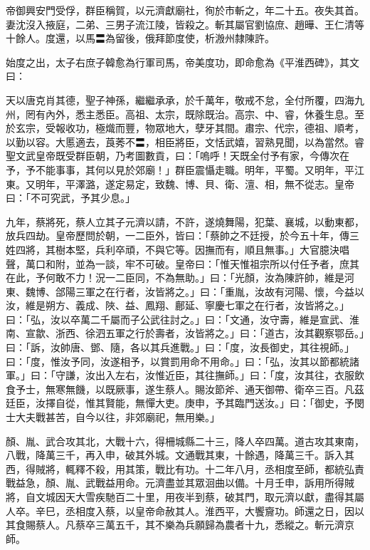 \begin{pinyinscope}
 帝御興安門受俘，群臣稱賀，以元濟獻廟社，徇於市斬之，年二十五。夜失其首。妻沈沒入掖庭，二弟、三男子流江陵，皆殺之。斬其屬官劉協庶、趙曄、王仁清等十餘人。度還，以馬〓為留後，俄拜節度使，析溵州隸陳許。



 始度之出，太子右庶子韓愈為行軍司馬，帝美度功，即命愈為《平淮西碑》，其文曰：



 天以唐克肖其德，聖子神孫，繼繼承承，於千萬年，敬戒不怠，全付所覆，四海九州，罔有內外，悉主悉臣。高祖、太宗，既除既治。高宗、中、睿，休養生息。至於玄宗，受報收功，極熾而豐，物眾地大，孽牙其間。肅宗、代宗，德祖、順考，以勤以容。大慝適去，莨莠不〓，相臣將臣，文恬武嬉，習熟見聞，以為當然。睿聖文武皇帝既受群臣朝，乃考圖數貢，曰：「嗚呼！天既全付予有家，今傳次在予，予不能事事，其何以見於郊廟！」群臣震懾走職。明年，平蜀。又明年，平江東。又明年，平澤潞，遂定易定，致魏、博、貝、衛、澶、相，無不從志。皇帝曰：「不可究武，予其少息。」



 九年，蔡將死，蔡人立其子元濟以請，不許，遂燒舞陽，犯葉、襄城，以動東都，放兵四劫。皇帝歷問於朝，一二臣外，皆曰：「蔡帥之不廷授，於今五十年，傳三姓四將，其樹本堅，兵利卒頑，不與它等。因撫而有，順且無事。」大官臆決唱聲，萬口和附，並為一談，牢不可破。皇帝曰：「惟天惟祖宗所以付任予者，庶其在此，予何敢不力！況一二臣同，不為無助。」曰：「光顏，汝為陳許帥，維是河東、魏博、郃陽三軍之在行者，汝皆將之。」曰：「重胤，汝故有河陽、懷，今益以汝，維是朔方、義成、陜、益、鳳翔、鄜延、寧慶七軍之在行者，汝皆將之。」曰：「弘，汝以卒萬二千屬而子公武往討之。」曰：「文通，汝守壽，維是宣武、淮南、宣歙、浙西、徐泗五軍之行於壽者，汝皆將之。」曰：「道古，汝其觀察鄂岳。」曰：「訴，汝帥唐、鄧、隨，各以其兵進戰。」曰：「度，汝長御史，其往視師。」曰：「度，惟汝予同，汝遂相予，以賞罰用命不用命。」曰：「弘，汝其以節都統諸軍。」曰：「守謙，汝出入左右，汝惟近臣，其往撫師。」曰：「度，汝其往，衣服飲食予士，無寒無饑，以既厥事，遂生蔡人。賜汝節斧、通天御帶、衛卒三百。凡茲廷臣，汝擇自從，惟其賢能，無憚大吏。庚申，予其臨門送汝。」曰：「御史，予閔士大夫戰甚苦，自今以往，非郊廟祀，無用樂。」



 顏、胤、武合攻其北，大戰十六，得柵城縣二十三，降人卒四萬。道古攻其東南，八戰，降萬三千，再入申，破其外城。文通戰其東，十餘遇，降萬三千。訴入其西，得賊將，輒釋不殺，用其策，戰比有功。十二年八月，丞相度至師，都統弘責戰益急，顏、胤、武戰益用命。元濟盡並其眾洄曲以備。十月壬申，訴用所得賊將，自文城因天大雪疾馳百二十里，用夜半到蔡，破其門，取元濟以獻，盡得其屬人卒。辛巳，丞相度入蔡，以皇帝命赦其人。淮西平，大饗齎功。師還之日，因以其食賜蔡人。凡蔡卒三萬五千，其不樂為兵願歸為農者十九，悉縱之。斬元濟京師。




\end{pinyinscope}
